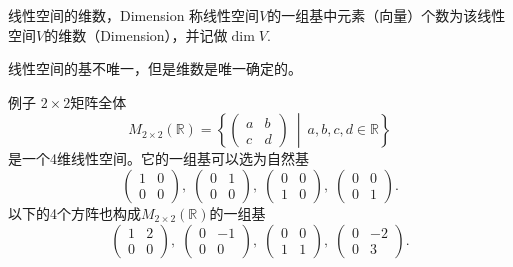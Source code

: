 
\begin{frame}

\begin{block}{线性空间的维数，Dimension}
称线性空间$V$的一组基中元素（向量）个数为该线性空间$V$的维数（Dimension），并记做$\dim V$.
\end{block}

\vspace{2em}
\pause

\begin{remark}
线性空间的基不唯一，但是维数是唯一确定的。
\end{remark}

\end{frame}


\begin{frame}

\begin{block}{例子}
$2\times 2$矩阵全体
\[M_{2\times 2}(\mathbb{R}) = \left\{ \begin{pmatrix}
a & b \\ c & d \end{pmatrix} \ \middle|\ a,b,c,d \in \mathbb{R} \right\}\]
是一个4维线性空间。它的一组基可以选为自然基
\[\begin{pmatrix} 1 & 0 \\ 0 & 0 \end{pmatrix}, \; \begin{pmatrix} 0 & 1 \\ 0 & 0 \end{pmatrix}, \; \begin{pmatrix} 0 & 0 \\ 1 & 0 \end{pmatrix}, \; \begin{pmatrix} 0 & 0 \\ 0 & 1 \end{pmatrix}.\]
以下的4个方阵也构成$M_{2\times 2}(\mathbb{R})$的一组基
\[\begin{pmatrix} 1 & 2 \\ 0 & 0 \end{pmatrix}, \; \begin{pmatrix} 0 & -1 \\ 0 & 0 \end{pmatrix}, \; \begin{pmatrix} 0 & 0 \\ 1 & 1 \end{pmatrix}, \; \begin{pmatrix} 0 & -2 \\ 0 & 3 \end{pmatrix}.\]
\end{block}

\end{frame}

